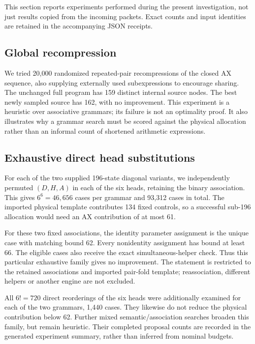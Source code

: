 \documentclass[10pt,letterpaper]{article}
\begin{document}
This section reports experiments performed during the present investigation,
not just results copied from the incoming packets. Exact counts and input
identities are retained in the accompanying JSON receipts.

\subsection{Global recompression}

We tried 20,000 randomized repeated-pair recompressions of the closed AX
sequence, also supplying externally used subexpressions to encourage sharing.
The unchanged full program has 159 distinct internal source nodes. The best
newly sampled source has 162, with no improvement. This experiment is a
heuristic over associative grammars; its failure is not an optimality proof.
It also illustrates why a grammar search must be scored against the physical
allocation rather than an informal count of shortened arithmetic expressions.

\subsection{Exhaustive direct head substitutions}

For each of the two supplied 196-state diagonal variants, we independently
permuted $(D,H,A)$ in each of the six heads, retaining the binary association.
This gives $6^6=46,656$ cases per grammar and 93,312 cases in total.
The imported physical template contributes 134 fixed controls, so a successful
sub-196 allocation would need an AX contribution of at most 61.

For these two fixed associations, the identity parameter assignment is the
unique case with matching bound 62. Every nonidentity assignment has bound at
least 66. The eligible cases also receive the exact simultaneous-helper check.
Thus this particular exhaustive family gives no improvement. The statement is
restricted to the retained associations and imported pair-fold template;
reassociation, different helpers or another engine are not excluded.

All $6!=720$ direct reorderings of the six heads were additionally examined for
each of the two grammars, 1,440 cases. They likewise do not reduce the physical
contribution below 62. Further mixed semantic/association searches broaden this
family, but remain heuristic. Their completed proposal counts are recorded in
the generated experiment summary, rather than inferred from nominal budgets.
\end{document}
